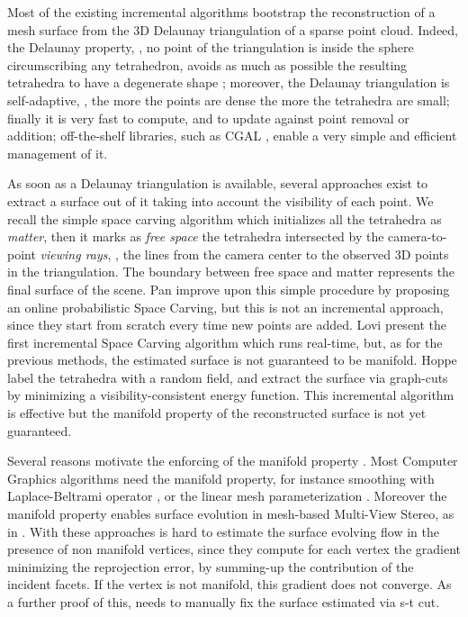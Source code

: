 Most of the existing incremental algorithms \cite{lovi_et_al_11,Pan_et_al09,litvinov_lhuillier_13,litvinov_Lhiuller14} bootstrap the reconstruction of a mesh surface from the 3D Delaunay triangulation of a sparse point cloud. Indeed, the Delaunay property, \ie, no point of the triangulation is inside the sphere circumscribing any tetrahedron, avoids as much as possible the resulting tetrahedra to have a degenerate shape \cite{Maur_02}; moreover, the Delaunay triangulation  is self-adaptive, \ie, the more the points are dense the more the tetrahedra are small; finally it is very fast to compute, and to  update against point removal or addition; off-the-shelf libraries, such as CGAL \cite{cgal}, enable a very simple and efficient management of it. 

As soon as a Delaunay triangulation is available, several approaches exist to extract a surface out of it taking into account the visibility of each point. 
We recall the simple space carving algorithm \cite{kutulakos_seitz05} which initializes all the tetrahedra as \emph{matter}, then it marks as \emph{free space} the tetrahedra intersected by the camera-to-point \emph{viewing rays}, \ie, the lines from the camera center to the observed 3D points in the triangulation. 
The boundary between free space and matter represents the final surface of the scene.
Pan \etal \cite{Pan_et_al09} improve upon this simple procedure by proposing an online probabilistic Space Carving, but this is not an incremental approach, since they start from scratch every time new points are added.
Lovi \etal \cite{lovi_et_al_11} present the first incremental Space Carving algorithm which runs real-time, but, as for the previous methods, the estimated surface is not guaranteed to be manifold.
 Hoppe \etal \cite{Hoppe13} label the tetrahedra with a random field, and extract the surface via graph-cuts by minimizing a visibility-consistent energy function. This incremental algorithm is effective but the manifold property of the reconstructed surface is not yet guaranteed.


Several reasons motivate the enforcing of the manifold property \cite{lhuillier20152}. 
Most Computer Graphics algorithms need the manifold property, for instance smoothing with Laplace-Beltrami operator \cite{Meyer03}, or the linear mesh parameterization \cite{saboret00}.
Moreover the manifold property enables surface evolution in mesh-based Multi-View Stereo, as in \cite{vu_et_al_2012,delaunoy_et_al_08}.
With these approaches is hard to estimate the surface evolving flow in the presence of non manifold vertices, since they compute for each vertex the gradient minimizing the reprojection error, by summing-up the contribution of the incident facets. If the vertex is not manifold, this gradient does not converge. As a further proof of this, \cite{vu_et_al_2012} needs to manually fix the surface estimated via s-t cut.

